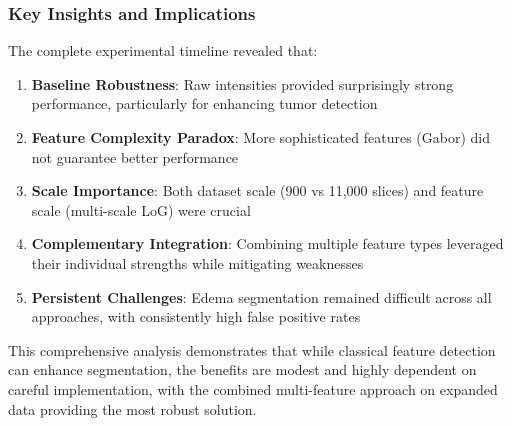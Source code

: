 \subsubsection{Key Insights and Implications}

The complete experimental timeline revealed that:

\begin{enumerate}
    \item \textbf{Baseline Robustness}: Raw intensities provided surprisingly strong performance, particularly for enhancing tumor detection
    \item \textbf{Feature Complexity Paradox}: More sophisticated features (Gabor) did not guarantee better performance
    \item \textbf{Scale Importance}: Both dataset scale (900 vs 11,000 slices) and feature scale (multi-scale LoG) were crucial
    \item \textbf{Complementary Integration}: Combining multiple feature types leveraged their individual strengths while mitigating weaknesses
    \item \textbf{Persistent Challenges}: Edema segmentation remained difficult across all approaches, with consistently high false positive rates
\end{enumerate}

This comprehensive analysis demonstrates that while classical feature detection can enhance segmentation, the benefits are modest and highly dependent on careful implementation, with the combined multi-feature approach on expanded data providing the most robust solution.







